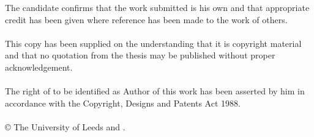 
\begin{ipstatement} %
The candidate confirms that the work submitted is his own and that
appropriate credit has been given where reference has been made to
the work of others.
\\
\\
This copy has been supplied on the understanding that it is copyright
material and that no quotation from the thesis may be published
without proper acknowledgement.
\\
\\
The right of \theAuthor{} to be identified as Author of this work
has been asserted by him in accordance with the Copyright, Designs
and Patents Act 1988.
\\
\\
\copyright{} \yeardate{\today} The University of Leeds and \theAuthor{}.

\end{ipstatement}


